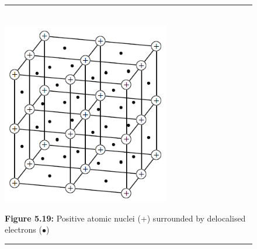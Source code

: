 	\begin{figure}[H] %
    \begin{center}
    \rule[.1in]{\figurerulewidth}{.005in} \\
        \label{m38694*uid78!!!underscore!!!media}\label{m38694*uid78!!!underscore!!!printimage}\includegraphics[height=8cm]{col11305.imgs/m38694_CG11C1_022.png} %
      \vspace{2pt}
    \vspace{\rubberspace}\par \begin{cnxcaption}
	  \small \textbf{Figure 5.19: }Positive atomic nuclei (+) surrounded by delocalised electrons ($\ensuremath{\bullet}$)
	\end{cnxcaption}
    \vspace{.1in}
    \rule[.1in]{\figurerulewidth}{.005in} \\
    \end{center}
 \end{figure}       
        \label{m38694*id754}
